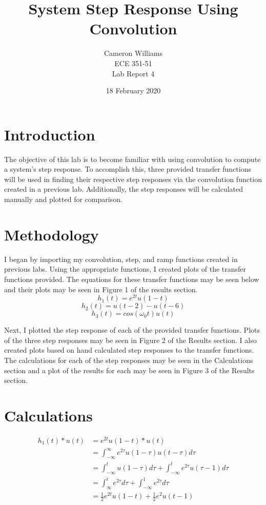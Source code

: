 \documentclass[12pt]{article}
\title{System Step Response Using Convolution}
\author{Cameron Williams\\ECE 351-51\\Lab Report 4}
\date{18 February 2020}
\begin{document}
\vspace{\fill}
\maketitle
\vspace{\fill}
\clearpage

\newpage
\section{Introduction}
    \par The objective of this lab is to become familiar with using convolution to compute a system's step response. To accomplish this, three provided transfer functions will be used in finding their respective step responses via the convolution function created in a previous lab. Additionally, the step responses will be calculated manually and plotted for comparison.
\newpage

\section{Methodology}
    \par I began by importing my convolution, step, and ramp functions created in previous labs. Using the appropriate functions, I created plots of the transfer functions provided. The equations for these transfer functions may be seen below and their plots may be seen in Figure 1 of the results section.
    $$ h_1(t)=e^{2t}u(1-t) $$
    $$ h_2(t)=u(t-2)-u(t-6) $$
    $$ h_3(t)=cos(\omega_0t)u(t) $$
    
    \par Next, I plotted the step response of each of the provided transfer functions. Plots of the three step responses may be seen in Figure 2 of the Results section. I also created plots based on hand calculated step responses to the transfer functions. The calculations for each of the step responses may be seen in the Calculations section and a plot of the results for each may be seen in Figure 3 of the Results section.

\newpage
\section{Calculations}
\begin{align*}
h_1(t)*u(t) &= e^{2t}u(1-t)*u(t) \\
 &= \int_{-\infty}^{\infty} e^{2\tau}u(1-\tau)u(t-\tau)d\tau \\
 &= \int_{-\infty}^{t} u(1-\tau)d\tau + \int_{-\infty}^{t} e^{2\tau}u(\tau - 1)d\tau \\
 &= \int_{\infty}^{t} e^{2\tau}d\tau + \int_{-\infty}^{1} e^{2\tau}d\tau \\
 &= \frac{1}{2}e^{2t}u(1-t)+\frac{1}{2}e^2u(t-1) 
\end{align*}
\end{document}
